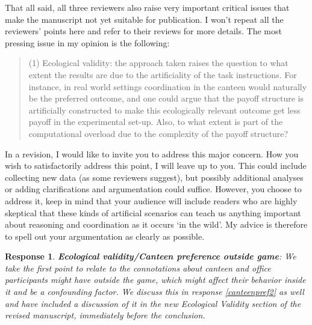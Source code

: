 \documentclass[a4paper]{article}
\newtheorem{response}{Response}
\newenvironment{robin}{\smallskip \noindent \color{red!10!green!50!blue}}{\color{black}\smallskip}
\begin{document}
\medskip 
That all said, all three reviewers also raise very important critical issues that make the manuscript not yet suitable for publication. I won't repeat all the reviewers' points here and refer to their reviews for more details. The most pressing issue in my opinion is the following:
\begin{quote}
(1)    Ecological validity: the approach taken raises the question to what extent the results are due to the artificiality of the task instructions.
 For instance, in real world settings coordination in the canteen would naturally be the preferred outcome, and one could argue that the payoff structure is artificially constructed to make this ecologically relevant outcome get less payoff in the experimental set-up. Also, to what extent is part of the computational overload due to the complexity of the payoff structure?  
\end{quote}
In a revision, I would like to invite you to address this major concern. How you wish to satisfactorily address this point, I will leave up to you. This could include collecting new data (as some reviewers suggest), but possibly additional analyses or adding clarifications and argumentation could suffice. However, you choose to address it, keep in mind that your audience will include readers who are highly skeptical that these kinds of artificial scenarios can teach us anything important about reasoning and coordination as it occurs ‘in the wild’. My advice is therefore to spell out your argumentation as clearly as possible. 

\begin{response}\label{canteenpref}
{\bfseries Ecological validity/Canteen preference outside game}: We take the first point to relate to the connotations about canteen and office participants might have outside the game, which might affect their behavior inside it and be a confounding factor. We discuss this in response \ref{canteenpref2} as well and have included a discussion of it in the new  Ecological Validity section of the revised manuscript, immediately before the conclusion.  
\end{response}
\end{document}
